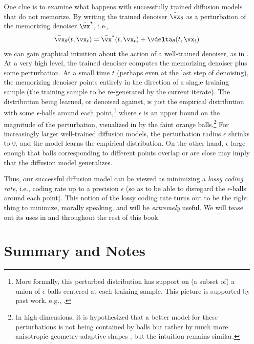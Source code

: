 \documentclass[../../book-main.tex]{subfiles}
\begin{document}
One clue is to examine what happens with successfully trained
diffusion models that do not memorize. By writing the trained
denoiser \(\bar{\vx}_{\theta}\) as a perturbation of the memorizing
denoiser \(\bar{\vx}^{\star}\), i.e.,
\begin{equation}
    \bar{\vx}_{\theta}(t, \vx_{t}) = \bar{\vx}^{\star}(t, \vx_{t}) +
    \vdelta_{\theta}(t, \vx_{t})
\end{equation}
we can gain graphical intuition about the action of a well-trained
denoiser, as in . At a very high
level, the trained denoiser computes the memorizing denoiser plus some
perturbation. At a small time \(t\) (perhaps even at the last step of
denoising), the memorizing denoiser points entirely in the direction
of a single training sample (the training sample to be re-generated
by the current iterate). The distribution being learned, or denoised
against, is just the empirical distribution with some
\(\epsilon\)-balls around each point,\footnote{More formally, this
    perturbed distribution has support on (a subset of) a union of
    \(\epsilon\)-balls centered at each training sample. This picture is
supported by past work, e.g., \cite{song2025selective}.} where
\(\epsilon\) is an upper bound on the magnitude of the perturbation,
visualized in  by the faint orange
balls.\footnote{In high dimensions, it is hypothesized that a better
    model for these perturbations is not being contained by balls but
    rather by much more anisotropic geometry-adaptive shapes
\cite{farghly2025diffusion}, but the intuition remains similar.} For
increasingly larger well-trained diffusion models, the
perturbation radius \(\epsilon\) shrinks to \(0\), and the model
learns the empirical distribution. On the other hand, \(\epsilon\)
large enough that balls corresponding to different points overlap
or are close may imply that the diffusion model generalizes.

Thus, our successful diffusion model can be viewed as minimizing a
\textit{lossy coding rate}, i.e., coding rate up to a precision
\(\epsilon\) (so as to be able to disregard the \(\epsilon\)-balls
around each point). This notion of the lossy coding rate turns out to
be the right thing to minimize, morally speaking, and will be
\textit{extremely} useful. We will tease out its uses in
 and throughout the rest of this book.

\section{Summary and Notes}
\end{document}
